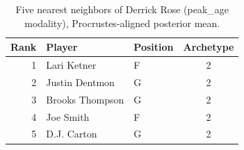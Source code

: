 \begin{table}[htbp]
  \centering\small
  \begin{tabular}{rllc}
    \toprule
    Rank & Player & Position & Archetype \\
    \midrule
    1 & Lari Ketner & F & 2 \\
    2 & Justin Dentmon & G & 2 \\
    3 & Brooks Thompson & G & 2 \\
    4 & Joe Smith & F & 2 \\
    5 & D.J. Carton & G & 2 \\
    \bottomrule
  \end{tabular}
  \caption{Five nearest neighbors of Derrick Rose (peak_age modality), Procrustes-aligned posterior mean.}
  \label{tab:Derrick_Rose_neighbors_peak_age}
\end{table}

